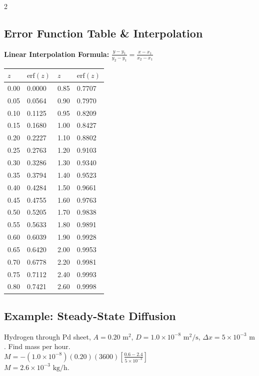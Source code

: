\documentclass[8pt]{article}
\begin{document}
\begin{multicols*}{2}
  \subsection*{Error Function Table \& Interpolation}
  \textbf{Linear Interpolation Formula:} \( \frac{y - y_1}{y_2 - y_1} = \frac{x - x_1}{x_2 - x_1} \) \\

  \begin{center}
    \scriptsize
    \begin{tabular}{ll|ll}
      \toprule
      \( z \) & \( \text{erf}(z) \) & \( z \) & \( \text{erf}(z) \) \\
      \midrule
      0.00 & 0.0000 & 0.85 & 0.7707 \\
      0.05 & 0.0564 & 0.90 & 0.7970 \\
      0.10 & 0.1125 & 0.95 & 0.8209 \\
      0.15 & 0.1680 & 1.00 & 0.8427 \\
      0.20 & 0.2227 & 1.10 & 0.8802 \\
      0.25 & 0.2763 & 1.20 & 0.9103 \\
      0.30 & 0.3286 & 1.30 & 0.9340 \\
      0.35 & 0.3794 & 1.40 & 0.9523 \\
      0.40 & 0.4284 & 1.50 & 0.9661 \\
      0.45 & 0.4755 & 1.60 & 0.9763 \\
      0.50 & 0.5205 & 1.70 & 0.9838 \\
      0.55 & 0.5633 & 1.80 & 0.9891 \\
      0.60 & 0.6039 & 1.90 & 0.9928 \\
      0.65 & 0.6420 & 2.00 & 0.9953 \\
      0.70 & 0.6778 & 2.20 & 0.9981 \\
      0.75 & 0.7112 & 2.40 & 0.9993 \\
      0.80 & 0.7421 & 2.60 & 0.9998 \\
      \bottomrule
    \end{tabular}
  \end{center}

  \subsection*{Example: Steady-State Diffusion}
  Hydrogen through Pd sheet, \( A = 0.20 \text{ m}^2 \), \( D = 1.0\times 10^{-8} \text{ m}^2\text{/s} \), \( \Delta x = 5\times 10^{-3} \text{ m} \). Find mass per hour.\\
  \( M = -(1.0\times 10^{-8})(0.20)(3600)\left[\frac{0.6 - 2.4}{5\times 10^{-3}}\right] \) \\
  \( M = 2.6\times 10^{-3} \text{ kg/h} \).


\end{multicols*}
\end{document}
